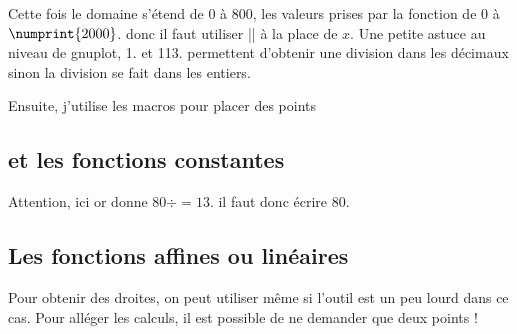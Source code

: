 Cette fois le domaine s'étend de 0 à 800, les valeurs prises par la fonction de $0$ à $\numprint{2000}$.  donc il faut utiliser |\x| à la place de $x$. Une petite astuce au niveau de gnuplot, 1. et 113. permettent d'obtenir une division dans les décimaux sinon la division se fait dans les entiers.

Ensuite, j'utilise les macros pour placer des points
\begin{tkzexample}[vbox]
\end{tkzexample}

\subsection{ et les fonctions constantes}

Attention, ici   or  donne $80\div=13$. il faut donc écrire $80.$


\subsection{Les fonctions affines ou linéaires}
Pour obtenir des droites, on peut utiliser  même si l'outil est un peu lourd dans ce cas. Pour alléger les calculs, il est possible de ne demander que deux points !

\begin{tkzexample}[vbox]
\end{tkzexample}
